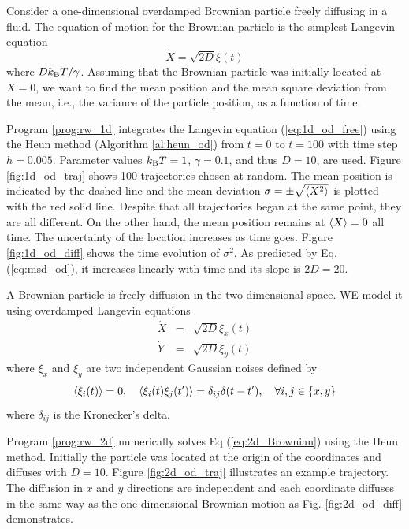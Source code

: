 \bigskip
\begin{example}\label{ex:wiener_1d}

Consider a one-dimensional overdamped Brownian particle freely diffusing in a fluid. The equation of motion for the Brownian particle is the simplest Langevin equation
\begin{equation}\label{eq:1d_od_free}
\dot{X} = \sqrt{2D} \xi(t)
\end{equation}
where $Dk_\text{B} T/\gamma$. Assuming that the Brownian particle was initially located at $X=0$, we want to find the mean position and the mean square deviation from the mean, i.e., the variance of the particle position, as a function of time.

Program \ref{prog:rw_1d} integrates the Langevin equation (\ref{eq:1d_od_free}) using the Heun method (Algorithm \ref{al:heun_od}) from $t=0$ to $t=100$ with time step $h=0.005$.  Parameter values $k_\text{B} T=1$, $\gamma=0.1$, and thus $D=10$, are used.  Figure \ref{fig:1d_od_traj} shows 100 trajectories chosen at random.
The mean position is indicated by the dashed line and the mean deviation $\sigma=\pm \sqrt{\langle X^2 \rangle}$ is plotted with the red solid line.
Despite that all trajectories began at the same point, they are all different.  On the other hand, the mean position remains at $\langle X \rangle=0$ all time.  The uncertainty of the location increases as time goes.   Figure \ref{fig:1d_od_diff} shows the time evolution of $\sigma^2$. As predicted by
Eq. (\ref{eq:msd_od}),  it increases linearly with time and its slope is $2D=20$.
\end{example}

\newpage
\begin{example}\label{ex:2d_Brownian}

A Brownian particle is freely diffusion in the two-dimensional space. WE model it using overdamped Langevin equations
\begin{subequations}\label{eq:2d_Brownian}
\begin{eqnarray}
\dot{X} &=& \sqrt{2D} \xi_x(t) \\
\dot{Y} &=& \sqrt{2D} \xi_y(t)
\end{eqnarray}
\end{subequations}
where $\xi_x$ and $\xi_y$ are two independent Gaussian noises defined by 
\begin{equation}
\langle \xi_i(t) \rangle=0, \quad \langle \xi_i(t) \xi_j(t') \rangle = \delta_{ij} \delta(t-t'), \quad \forall i,j \in \{x,y\}
\end{equation}
where $\delta_{ij}$ is the Kronecker's delta.

Program \ref{prog:rw_2d} numerically solves Eq (\ref{eq:2d_Brownian}) using the Heun method. Initially the particle was located at the origin of the coordinates and diffuses with $D=10$. Figure \ref{fig:2d_od_traj} illustrates an example trajectory.  The diffusion in $x$ and $y$ directions are independent and each coordinate diffuses in the same way as the one-dimensional Brownian motion as Fig. \ref{fig:2d_od_diff} demonstrates.


\end{example}

